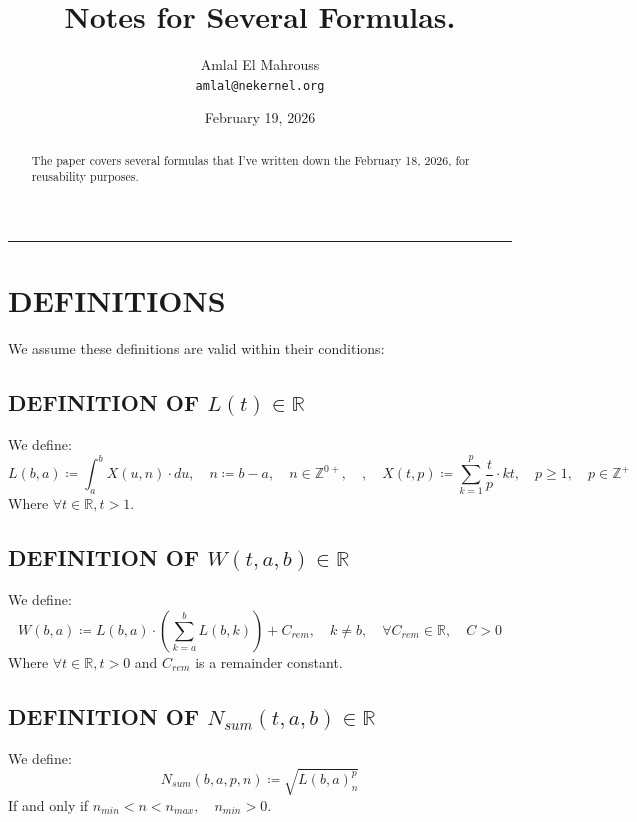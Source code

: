\documentclass[11pt, a4paper]{article}
\title{Notes for Several Formulas.}
\author{Amlal El Mahrouss\\\texttt{amlal@nekernel.org}}
\date{February 19, 2026}
\begin{document}
\maketitle

\begin{center}
	\rule[0.01cm]{17cm}{0.01cm}
\end{center}

\begin{abstract}
\begin{center}
    The paper covers several formulas that I've written down the February 18, 2026, for reusability purposes.
\end{center}
\end{abstract}

\section{DEFINITIONS}

We assume these definitions are valid within their conditions:

\subsection{DEFINITION OF $L(t) \in \mathbb{R}$}
We define:
\begin{equation}
	L(b, a) \coloneqq \int_{a}^{b}X(u, n)\cdot du, \quad n \coloneqq b - a, \quad n \in \mathbb{Z}^{0+}, \quad, \quad X(t, p) \coloneqq \sum_{k=1}^{p}\frac{t}{p}\cdot kt, \quad p \geq 1, \quad p \in \mathbb{Z}^{+}
\end{equation}
Where $\forall t \in \mathbb{R}, t > 1$.

\subsection{DEFINITION OF $W(t, a, b) \in \mathbb{R}$}
We define:
\begin{equation}
    W(b, a) \coloneqq L(b, a)\cdot(\sum_{k=a}^{b} L(b, k)) +C_{rem}, \quad k \neq b,\quad \forall C_{rem} \in \mathbb{R}, \quad C > 0
\end{equation}
Where $\forall t \in \mathbb{R}, t > 0$ and $C_{rem}$ is a remainder constant.

\subsection{DEFINITION OF $N_{sum}(t, a, b) \in \mathbb{R}$}

We define:
\begin{equation}
    N_{sum}(b, a, p, n) \coloneqq \sqrt{L(b, a)^p_{n}}
\end{equation}
If and only if $n_{min} < n < n_{max}, \quad n_{min} > 0$.
\end{document}
